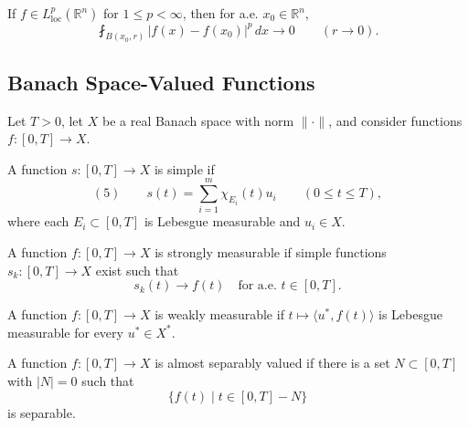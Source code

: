 \begin{remark}
\label{rem:lebesgue-differentiation-lp}
If $f\in L^p_{\mathrm{loc}}(\mathbb R^n)$ for $1\leq p<\infty$, then for a.e.
$x_0\in\mathbb R^n$,
\[
\fint_{B(x_0,r)}|f(x)-f(x_0)|^p\,dx\to0
\qquad(r\to0).
\]
\end{remark}

\subsection{Banach Space-Valued Functions}
\label{sec:banach-space-valued-functions}

Let $T>0$, let $X$ be a real Banach space with norm $\|\cdot\|$, and consider
functions $f:[0,T]\to X$.

\begin{definition}
\label{def:simple-function-banach-valued}
A function $s:[0,T]\to X$ is simple if
\[
(5)\qquad
s(t)=\sum_{i=1}^m\chi_{E_i}(t)u_i
\qquad(0\leq t\leq T),
\]
where each $E_i\subset[0,T]$ is Lebesgue measurable and $u_i\in X$.
\end{definition}

\begin{definition}
\label{def:strongly-measurable-function}
A function $f:[0,T]\to X$ is strongly measurable if simple functions
$s_k:[0,T]\to X$ exist such that
\[
s_k(t)\to f(t)\quad\text{for a.e. }t\in[0,T].
\]
\end{definition}

\begin{definition}
\label{def:weakly-measurable-function}
A function $f:[0,T]\to X$ is weakly measurable if
$t\mapsto\langle u^*,f(t)\rangle$ is Lebesgue measurable for every $u^*\in X^*$.
\end{definition}

\begin{definition}
\label{def:almost-separably-valued}
A function $f:[0,T]\to X$ is almost separably valued if there is a set
$N\subset[0,T]$ with $|N|=0$ such that
\[
\{f(t)\mid t\in[0,T]-N\}
\]
is separable.
\end{definition}

